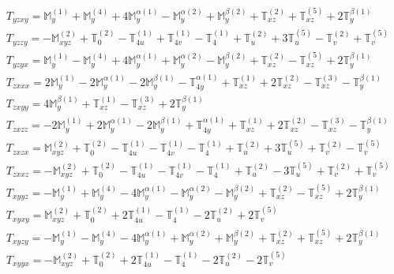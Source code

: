 \documentclass[fleqn,8pt,landscape]{jsarticle}
\begin{document}
\begin{align*}
& T_{yzxy} = \mathbb{M}_{y}^{(1)} + \mathbb{M}_{y}^{(4)} + 4 \mathbb{M}_{y}^{\alpha(1)} - \mathbb{M}_{y}^{\alpha(2)} + \mathbb{M}_{y}^{\beta(2)} + \mathbb{T}_{xz}^{(2)} + \mathbb{T}_{xz}^{(5)} + 2 \mathbb{T}_{y}^{\beta(1)} \\
& T_{yzzy} = - \mathbb{M}_{xyz}^{(2)} + \mathbb{T}_{0}^{(2)} - \mathbb{T}_{4u}^{(1)} + \mathbb{T}_{4v}^{(1)} - \mathbb{T}_{4}^{(1)} + \mathbb{T}_{u}^{(2)} + 3 \mathbb{T}_{u}^{(5)} - \mathbb{T}_{v}^{(2)} + \mathbb{T}_{v}^{(5)} \\
& T_{yzyx} = \mathbb{M}_{y}^{(1)} - \mathbb{M}_{y}^{(4)} + 4 \mathbb{M}_{y}^{\alpha(1)} + \mathbb{M}_{y}^{\alpha(2)} - \mathbb{M}_{y}^{\beta(2)} + \mathbb{T}_{xz}^{(2)} - \mathbb{T}_{xz}^{(5)} + 2 \mathbb{T}_{y}^{\beta(1)} \\
& T_{zxxx} = 2 \mathbb{M}_{y}^{(1)} - 2 \mathbb{M}_{y}^{\alpha(1)} - 2 \mathbb{M}_{y}^{\beta(1)} - \mathbb{T}_{4y}^{\alpha(1)} + \mathbb{T}_{xz}^{(1)} + 2 \mathbb{T}_{xz}^{(2)} - \mathbb{T}_{xz}^{(3)} - \mathbb{T}_{y}^{\beta(1)} \\
& T_{zxyy} = 4 \mathbb{M}_{y}^{\beta(1)} + \mathbb{T}_{xz}^{(1)} - \mathbb{T}_{xz}^{(3)} + 2 \mathbb{T}_{y}^{\beta(1)} \\
& T_{zxzz} = - 2 \mathbb{M}_{y}^{(1)} + 2 \mathbb{M}_{y}^{\alpha(1)} - 2 \mathbb{M}_{y}^{\beta(1)} + \mathbb{T}_{4y}^{\alpha(1)} + \mathbb{T}_{xz}^{(1)} + 2 \mathbb{T}_{xz}^{(2)} - \mathbb{T}_{xz}^{(3)} - \mathbb{T}_{y}^{\beta(1)} \\
& T_{zxzx} = \mathbb{M}_{xyz}^{(2)} + \mathbb{T}_{0}^{(2)} - \mathbb{T}_{4u}^{(1)} - \mathbb{T}_{4v}^{(1)} - \mathbb{T}_{4}^{(1)} + \mathbb{T}_{u}^{(2)} + 3 \mathbb{T}_{u}^{(5)} + \mathbb{T}_{v}^{(2)} - \mathbb{T}_{v}^{(5)} \\
& T_{zxxz} = - \mathbb{M}_{xyz}^{(2)} + \mathbb{T}_{0}^{(2)} - \mathbb{T}_{4u}^{(1)} - \mathbb{T}_{4v}^{(1)} - \mathbb{T}_{4}^{(1)} + \mathbb{T}_{u}^{(2)} - 3 \mathbb{T}_{u}^{(5)} + \mathbb{T}_{v}^{(2)} + \mathbb{T}_{v}^{(5)} \\
& T_{xyyz} = - \mathbb{M}_{y}^{(1)} + \mathbb{M}_{y}^{(4)} - 4 \mathbb{M}_{y}^{\alpha(1)} - \mathbb{M}_{y}^{\alpha(2)} - \mathbb{M}_{y}^{\beta(2)} + \mathbb{T}_{xz}^{(2)} - \mathbb{T}_{xz}^{(5)} + 2 \mathbb{T}_{y}^{\beta(1)} \\
& T_{xyxy} = \mathbb{M}_{xyz}^{(2)} + \mathbb{T}_{0}^{(2)} + 2 \mathbb{T}_{4u}^{(1)} - \mathbb{T}_{4}^{(1)} - 2 \mathbb{T}_{u}^{(2)} + 2 \mathbb{T}_{v}^{(5)} \\
& T_{xyzy} = - \mathbb{M}_{y}^{(1)} - \mathbb{M}_{y}^{(4)} - 4 \mathbb{M}_{y}^{\alpha(1)} + \mathbb{M}_{y}^{\alpha(2)} + \mathbb{M}_{y}^{\beta(2)} + \mathbb{T}_{xz}^{(2)} + \mathbb{T}_{xz}^{(5)} + 2 \mathbb{T}_{y}^{\beta(1)} \\
& T_{xyyx} = - \mathbb{M}_{xyz}^{(2)} + \mathbb{T}_{0}^{(2)} + 2 \mathbb{T}_{4u}^{(1)} - \mathbb{T}_{4}^{(1)} - 2 \mathbb{T}_{u}^{(2)} - 2 \mathbb{T}_{v}^{(5)}
\end{align*}
\end{document}
